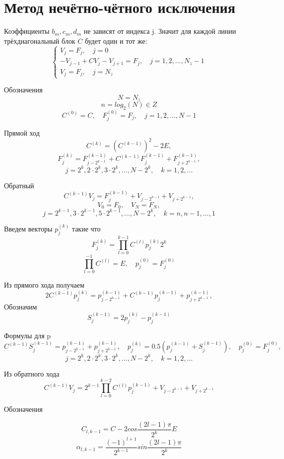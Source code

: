 \section{Метод нечётно-чётного исключения}

Коэффициенты $b_m, c_m, d_m$ не зависят от индекса j. Значит для каждой линии трёхдиагональный блок $C$ будет один и тот же:
\[ \begin{cases}
V_j = F_j, \quad j = 0 \\
-V_{j-1} + C V_j -V_{j+1} = F_j, \quad j = 1,2,\dots,N_z-1 \\
V_j = F_j, \quad j = N_z
\end{cases} \]

Обозначения
\[ N = N_z \]
\[ n = log_2(N) \in Z \]
\[ C^{(0)} = C, \quad F_j^{(0)} = F_j, \quad j=1,2,\dots,N-1 \]

Прямой ход
\[ C^{(k)} = (C^{(k-1)})^2 - 2E, \]
\[ F^{(k)}_j = F^{(k-1)}_{j-2^{k-1}} + C^{(k-1)} F^{(k-1)}_j + F^{(k-1)}_{j+2^{k-1}}, \]
\[ j = 2^k,2\cdot2^k,3\cdot2^k,\dots,N-2^k,\quad k = 1,2,\dots \]

Обратный
\[ C^{(k-1)} V_j = F^{(k-1)}_j + V_{j-2^{k-1}} + V_{j+2^{k-1}}, \]
\[ V_0 = F_0, \quad V_N = F_N, \]
\[ j = 2^{k-1},3\cdot2^{k-1},5\cdot2^{k-1},\dots,N-2^k,\quad k = n,n-1,\dots,1 \]

Введем векторы $p^{(k)}_j$ такие что
\[ F^{(k)}_j = \prod^{k-1}_{l=0} C^{(l)} p^{(k)}_j 2^k \]
\[ \prod^{-1}_{l=0} C^{(l)} = E, \quad p^{(0)}_j = F^{(0)}_j \]

Из прямого хода получаем
\[ 2 C^{(k-1)} p^{(k)}_j = p^{(k-1)}_{j-2^{k-1}} + C^{(k-1)} p^{(k-1)}_j + p^{(k-1)}_{j+2^{k-1}}, \]
Обозначим
\[ S^{(k-1)}_j = 2 p^{(k)}_j - p^{(k-1)}_j \]

Формулы для p
\[ C^{(k-1)} S^{(k-1)}_j = p^{(k-1)}_{j-2^{k-1}} + p^{(k-1)}_{j+2^{k-1}},\quad p^{(k)}_j = 0.5(p^{(k-1)}_j + S^{(k-1)}_j), \quad p^{(0)}_j = F^{(0)}_j, \]
\[ j = 2^k,2\cdot2^k,3\cdot2^k,\dots,N-2^k,\quad k = 1,2,\dots \]

Из обратного хода
\[ C^{(k-1)} V_j = 2^{k-1} \prod^{k-2}_{l=0} C^{(l)} p^{(k-1)}_j  + V_{j-2^{k-1}} + V_{j+2^{k-1}} \]

Обозначения



\[ C_{l, k-1} = C - 2 cos \frac{(2l-1) \pi }{2^k} E \]
\[ \alpha_{l, k-1} = \frac{(-1)^{l+1}}{2^{k-1}} sin \frac{(2l-1) \pi }{2^k} \]

